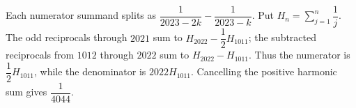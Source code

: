 Each numerator summand splits as $\dfrac{1}{2023-2k}-\dfrac{1}{2023-k}$. Put $H_n=\sum_{j=1}^n\dfrac{1}{j}$. The odd reciprocals through $2021$ sum to $H_{2022}-\dfrac{1}{2}H_{1011}$; the subtracted reciprocals from $1012$ through $2022$ sum to $H_{2022}-H_{1011}$. Thus the numerator is $\dfrac{1}{2}H_{1011}$, while the denominator is $2022H_{1011}$. Cancelling the positive harmonic sum gives $\boxed{\dfrac{1}{4044}}$.
